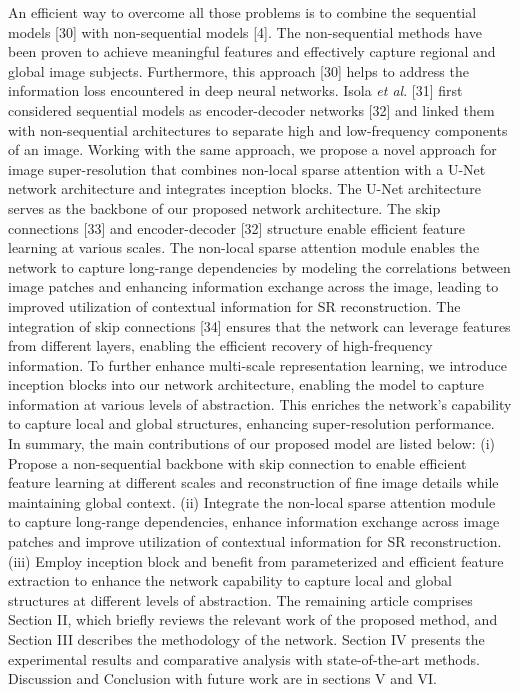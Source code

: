 \documentclass{ieeeaccess}
\begin{document}
An efficient way to overcome all those problems is to combine the sequential models [30] with non-sequential models [4]. The non-sequential methods have been proven to achieve meaningful features and effectively capture regional and global image subjects. Furthermore, this approach [30] helps to address the information loss encountered in deep neural networks. Isola \textit{et al}. [31] first considered sequential models as encoder-decoder networks [32] and linked them with non-sequential architectures to separate high and low-frequency components of an image. Working with the same approach, we propose a novel approach for image super-resolution that combines non-local sparse attention with a U-Net network architecture and integrates inception blocks. The U-Net architecture serves as the backbone of our proposed network architecture. The skip connections [33] and encoder-decoder [32] structure enable efficient feature learning at various scales. The non-local sparse attention module enables the network to capture long-range dependencies by modeling the correlations between image patches and enhancing information exchange across the image, leading to improved utilization of contextual information for SR reconstruction.  The integration of skip connections [34] ensures that the network can leverage features from different layers, enabling the efficient recovery of high-frequency information. To further enhance multi-scale representation learning, we introduce inception blocks into our network architecture, enabling the model to capture information at various levels of abstraction. This enriches the network's capability to capture local and global structures, enhancing super-resolution performance.
In summary, the main contributions of our proposed model are listed below:
(i)	Propose a non-sequential backbone with skip connection to enable efficient feature learning at different scales and reconstruction of fine image details while maintaining global context.
(ii)	Integrate the non-local sparse attention module to capture long-range dependencies, enhance information exchange across image patches and improve utilization of contextual information for SR reconstruction.
(iii)	Employ inception block and benefit from parameterized and efficient feature extraction to enhance the network capability to capture local and global structures at different levels of abstraction.
The remaining article comprises Section II, which briefly reviews the relevant work of the proposed method, and Section III describes the methodology of the network. Section IV presents the experimental results and comparative analysis with state-of-the-art methods. Discussion and Conclusion with future work are in sections V and VI.
\end{document}
